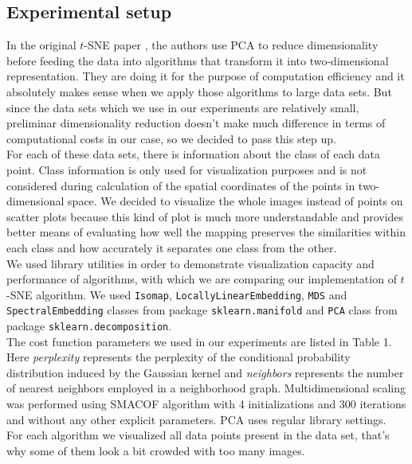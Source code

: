 \subsection{Experimental setup}

In the original $t$-SNE paper \cite{tsnearticle}, the authors use PCA to reduce dimensionality before feeding the data into algorithms that transform it into two-dimensional representation. They are doing it for the purpose of computation efficiency and it absolutely makes sense when we apply those algorithms to large data sets. But since the data sets which we use in our experiments are relatively small, preliminar dimensionality reduction doesn't make much difference in terms of computational costs in our case, so we decided to pass this step up.\\

For each of these data sets, there is information about the class of each data point. Class information is only used for visualization purposes and is not considered during calculation of the spatial coordinates of the points in two-dimensional space. We decided to visualize the whole images instead of points on scatter plots because this kind of plot is much more understandable and provides better means of evaluating how well the mapping preserves the similarities within each class and how accurately it separates one class from the other.\\

We used library utilities in order to demonstrate visualization capacity and performance of algorithms, with which we are comparing our implementation of $t$-SNE algorithm. We used \texttt{Isomap}, \texttt{LocallyLinearEmbedding}, \texttt{MDS} and \texttt{SpectralEmbedding} classes from package \texttt{sklearn.manifold} and \texttt{PCA} class from package \texttt{sklearn.decomposition}.\\

The cost function parameters we used in our experiments are listed in Table 1. Here \textit{perplexity} represents the perplexity of the conditional probability distribution induced by the Gaussian kernel and \textit{neighbors} represents the number of nearest neighbors employed in a neighborhood graph. Multidimensional scaling was performed using SMACOF algorithm with 4 initializations and 300 iterations and without any other explicit parameters. PCA uses regular library settings.\\

For each algorithm we visualized all data points present in the data set, that's why some of them look a bit crowded with too many images. 

